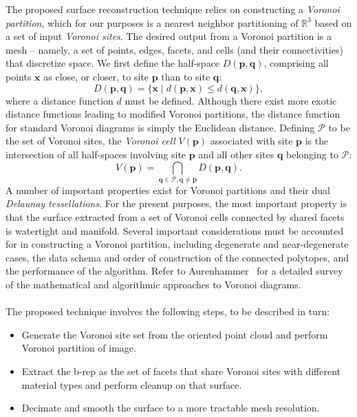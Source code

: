 %
The proposed surface reconstruction technique relies on constructing a \textit{Voronoi partition}, which for our purposes is a nearest neighbor partitioning of $\mathbb{R}^3$ based on a set of input \textit{Voronoi sites}. The desired output from a Voronoi partition is a mesh -- namely, a set of points, edges, facets, and cells (and their connectivities) that discretize space. We first define the half-space $D(\bm{p},\bm{q})$, comprising all points $\bm{x}$ as close, or closer, to site $\bm{p}$ than to site $\bm{q}$:
\begin{equation}
D(\bm{p},\bm{q}) = \{\bm{x} \mid d(\bm{p},\bm{x}) \leq d(\bm{q},\bm{x})\},
\end{equation}
where a distance function $d$ must be defined. Although there exist more exotic distance functions leading to modified Voronoi partitions, the distance function for standard Voronoi diagrams is simply the Euclidean distance. Defining $\mathcal{P}$ to be the set of Voronoi sites, the \textit{Voronoi cell} $V(\bm{p})$ associated with site $\bm{p}$ is the intersection of all half-spaces involving site $\bm{p}$ and all other sites $\bm{q}$ belonging to $\mathcal{P}$:
\begin{equation}
V(\bm{p}) = \bigcap \limits_{\bm{q} \in \mathcal{P}, \bm{q} \neq \bm{p}} D(\bm{p},\bm{q}).
\end{equation}
A number of important properties exist for Voronoi partitions and their dual \textit{Delaunay tessellations}. For the present purposes, the most important property is that the surface extracted from a set of Voronoi cells connected by shared facets is watertight and manifold. Several important considerations must be accounted for in constructing a Voronoi partition, including degenerate and near-degenerate cases, the data schema and order of construction of the connected polytopes, and the performance of the algorithm. Refer to Aurenhammer~\cite{aurenhammer_1991} for a detailed survey of the mathematical and algorithmic approaches to Voronoi diagrams. \\ \\
%
The proposed technique involves the following steps, to be described in turn:
\vspace{2mm}
\begin{itemize}[noitemsep]
\item Generate the Voronoi site set from the oriented point cloud and perform Voronoi partition of image.
\item Extract the b-rep as the set of facets that share Voronoi sites with different material types and perform cleanup on that surface.
\item Decimate and smooth the surface to a more tractable mesh resolution.
\end{itemize}

